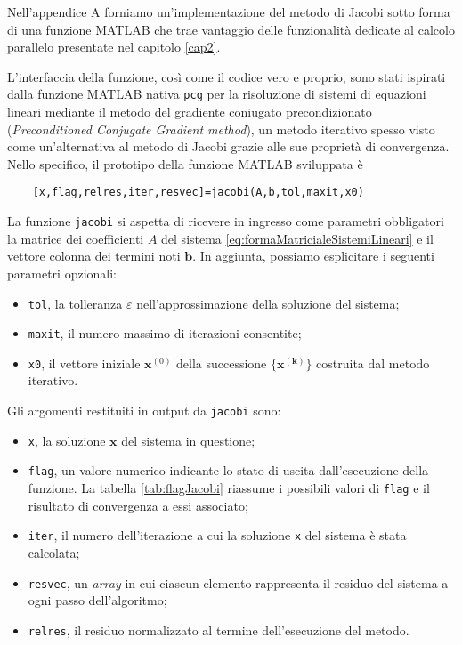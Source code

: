 Nell'appendice A forniamo un'implementazione del metodo di Jacobi sotto forma di una funzione MATLAB che trae vantaggio delle funzionalit\`a dedicate al 
calcolo parallelo presentate nel capitolo \ref{cap2}.

L'interfaccia della funzione, cos\`i come il codice vero e proprio, sono stati ispirati dalla funzione MATLAB nativa 
\lstinline|pcg| per la risoluzione di sistemi di equazioni lineari mediante il metodo del gradiente coniugato precondizionato\,\cite{MathWorksPCG} 
(\textit{Preconditioned Conjugate Gradient method}), un metodo iterativo spesso visto come un'alternativa al metodo di Jacobi grazie alle sue propriet\`a di convergenza.\newline
Nello specifico, il prototipo della funzione MATLAB sviluppata \`e
\begin{lstlisting}
    [x,flag,relres,iter,resvec]=jacobi(A,b,tol,maxit,x0)
\end{lstlisting}

La funzione \lstinline|jacobi| si aspetta di ricevere in ingresso come parametri obbligatori la matrice dei coefficienti $A$ del sistema \eqref{eq:formaMatricialeSistemiLineari} e il vettore colonna dei termini noti $\mathbf{b}$.\newline
In aggiunta, possiamo esplicitare i seguenti parametri opzionali:
\begin{itemize}
    \item \lstinline|tol|, la tolleranza $\varepsilon$ nell'approssimazione della soluzione del sistema;
    \item \lstinline|maxit|, il numero massimo di iterazioni consentite;
    \item \lstinline|x0|, il vettore iniziale $\mathbf{x}^{(0)}$ della successione $\mathbf{\{x^{(k)}\}}$ costruita dal metodo iterativo.
\end{itemize}

Gli argomenti restituiti in output da \lstinline|jacobi| sono:
\begin{itemize}
    \item \lstinline|x|, la soluzione $\mathbf{x}$ del sistema in questione;
    \item \lstinline|flag|, un valore numerico indicante lo stato di uscita dall'esecuzione della funzione. La tabella \ref{tab:flagJacobi} riassume i possibili valori di \lstinline|flag| e il risultato di convergenza a essi associato;
    \item \lstinline|iter|, il numero dell'iterazione a cui la soluzione \lstinline|x| del sistema \`e stata calcolata;
    \item \lstinline|resvec|, un \textit{array} in cui ciascun elemento rappresenta il residuo del sistema a ogni passo dell'algoritmo;
    \item \lstinline|relres|, il residuo normalizzato al termine dell'esecuzione del metodo.
\end{itemize}

